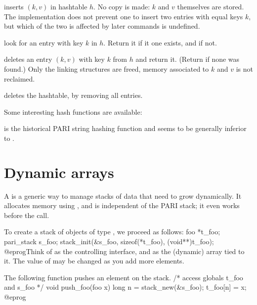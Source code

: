  inserts $(k,v)$
in hashtable $h$. No copy is made: $k$ and $v$ themselves are stored. The
implementation does not prevent one to insert two entries with equal
keys $k$, but which of the two is affected by later commands is undefined.

 look for an entry
with key $k$ in $h$. Return it if it one exists, and  if not.

 deletes an entry $(k,v)$
with key $k$ from $h$ and return it. (Return  if none was found.)
Only the linking structures are freed, memory associated to $k$ and $v$
is not reclaimed.

 deletes the hashtable, by removing all
entries.

Some interesting hash functions are available:


 is the historical PARI string hashing
function and seems to be generally inferior to .


\section{Dynamic arrays}

A  is a generic way to manage stacks of data that need
to grow dynamically. It allocates memory using , and is
independent of the PARI stack; it even works before the  call.


To create a stack of objects of type , we proceed as follows:
\bprog
foo *t_foo;
pari_stack s_foo;
stack_init(&s_foo, sizeof(*t_foo), (void**)t_foo);
@eprog\noindent Think of  as the controlling interface, and
 as the (dynamic) array tied to it. The value of 
may be changed as you add more elements.

The following function pushes an element on the stack.
\bprog
/* access globals t_foo and s_foo */
void push_foo(foo x)
{
  long n = stack_new(&s_foo);
  t_foo[n] = x;
}
@eprog


